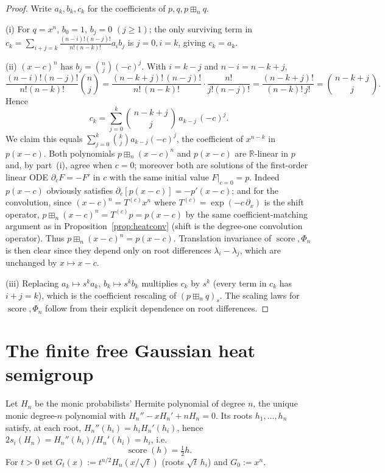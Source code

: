 \documentclass[12pt]{article}
\theoremstyle{remark}
\DeclareMathOperator{\score}{score}
\newcommand{\bR}{\mathbb{R}}
\newcommand{\boxp}{\boxplus_n}
\begin{document}
\begin{proof}
Write $a_k,b_k,c_k$ for the coefficients of $p,q,p\boxp q$.

(i) For $q=x^n$, $b_0=1$, $b_j=0$ $(j\ge1)$; the only surviving term in
$c_k=\sum_{i+j=k}\frac{(n-i)!(n-j)!}{n!(n-k)!}a_ib_j$ is $j=0,i=k$, giving
$c_k=a_k$.

(ii) $(x-c)^n$ has $b_j=\binom nj(-c)^j$. With $i=k-j$ and $n-i=n-k+j$,
\[
\frac{(n-i)!(n-j)!}{n!(n-k)!}\binom nj
=\frac{(n-k+j)!\,(n-j)!}{n!\,(n-k)!}\cdot\frac{n!}{j!(n-j)!}
=\frac{(n-k+j)!}{(n-k)!\,j!}
=\binom{\,n-k+j\,}{j}.
\]
Hence
\[
c_k=\sum_{j=0}^{k}\binom{\,n-k+j\,}{j}\,a_{k-j}\,(-c)^j .
\]
We claim this equals $\sum_{j=0}^k\binom kj a_{k-j}(-c)^j$, the coefficient of
$x^{n-k}$ in $p(x-c)$.  Both polynomials $p\boxp(x-c)^n$ and $p(x-c)$ are
$\bR$-linear in $p$ and, by part~(i), agree when $c=0$; moreover both are
solutions of the first-order linear ODE $\partial_c F=-F'$ in $c$ with the same
initial value $F|_{c=0}=p$.  Indeed $p(x-c)$ obviously satisfies
$\partial_c[p(x-c)]=-p'(x-c)$; and for the convolution, since
$(x-c)^n=T^{(c)}x^n$ where $T^{(c)}=\exp(-c\,\partial_x)$ is the shift operator,
$p\boxp(x-c)^n=T^{(c)}p=p(x-c)$ by the same coefficient-matching argument as in
Proposition~\ref{prop:heatconv} (shift is the degree-one convolution operator).
Thus $p\boxp(x-c)^n=p(x-c)$.
Translation invariance of $\score,\Phi_n$ is then clear since they depend only
on root differences $\lambda_i-\lambda_j$, which are unchanged by $x\mapsto x-c$.

(iii) Replacing $a_k\mapsto s^k a_k$, $b_k\mapsto s^kb_k$ multiplies $c_k$ by
$s^k$ (every term in $c_k$ has $i+j=k$), which is the coefficient rescaling of
$(p\boxp q)_s$. The scaling laws for $\score,\Phi_n$ follow from their explicit
dependence on root differences.
\end{proof}

\section{The finite free Gaussian heat semigroup}\label{sec:heat}

Let $H_n$ be the monic probabilists' Hermite polynomial of degree $n$, the
unique monic degree-$n$ polynomial with $H_n''-xH_n'+nH_n=0$.  Its roots
$h_1,\dots,h_n$ satisfy, at each root, $H_n''(h_i)=h_iH_n'(h_i)$, hence
$2s_i(H_n)=H_n''(h_i)/H_n'(h_i)=h_i$, i.e.\
\[
\score(h)=\tfrac12 h. \tag{4.1}
\]
For $t>0$ set $G_t(x):=t^{n/2}H_n(x/\sqrt t)$ (roots $\sqrt t\,h_i$) and
$G_0:=x^n$.
\end{document}
